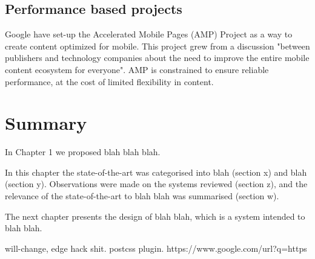 \subsection{Performance based projects}

Google have set-up the Accelerated Mobile Pages (AMP) Project as a way to create content optimized for mobile. This project grew from a discussion "between publishers and technology companies about the need to improve the entire mobile content ecosystem for everyone". AMP is constrained to ensure reliable performance, at the cost of limited flexibility in content.


\section{Summary} \label{l-r--summary}

In Chapter 1 we proposed blah blah blah.

In this chapter the state-of-the-art was categorised into blah (section x) and  blah (section y).  Observations were made on the systems reviewed (section z), and the relevance of the state-of-the-art to blah blah was summarised (section w).

The next chapter presents the design of blah blah, which is a system intended to blah blah.

will-change, edge hack shit. postcss plugin. https://www.google.com/url?q=https%